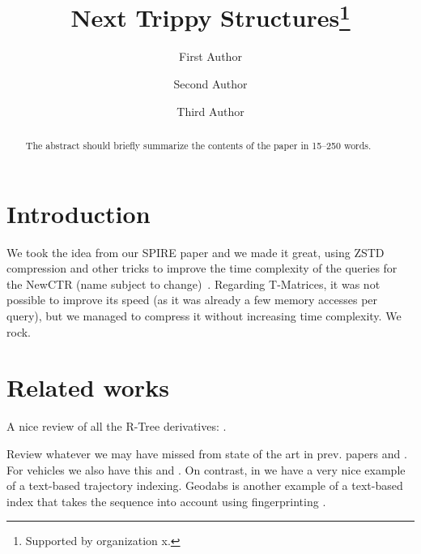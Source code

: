 \documentclass[runningheads]{llncs}
\newcommand{\acumm}{T-Matrices} %
\newcommand{\ctr}{NewCTR (name subject to change)\ }
\begin{document}
%
\title{Next Trippy Structures\thanks{Supported by organization x.}}
%
%
\author{First Author \and
Second Author \and
Third Author}
%
%
%
\maketitle              %
%
\begin{abstract}
The abstract should briefly summarize the contents of the paper in
15--250 words.

\end{abstract}
%
%
%
\section{Introduction}
We took the idea from our SPIRE paper and we made it great, using ZSTD compression and other tricks to improve the time complexity of the queries for the \ctr. Regarding \acumm, it was not possible to improve its speed (as it was already a few memory accesses per query), but we managed to compress it without increasing time complexity. We rock.

\section{Related works}
A nice review of all the R-Tree derivatives: \cite{john2017performance}.

Review whatever we may have missed from state of the art in prev. papers \cite{koide2018cinct} and \cite{ding2018ultraman}. For vehicles we also have this \cite{cai2018vector} and \cite{lovell2018lossless}. On contrast, in \cite{al2017semantictraj} we have a very nice example of a text-based trajectory indexing. Geodabs is another example of a text-based index that takes the sequence into account using fingerprinting \cite{chapuis2018geodabs}.
\end{document}
